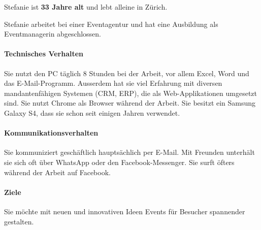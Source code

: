 \begin{minipage}{0.70\textwidth}
Stefanie ist \textbf{33 Jahre alt} und lebt alleine in Zürich.

Stefanie arbeitet bei einer Eventagentur und hat eine Ausbildung als Eventmanagerin abgeschlossen.

\paragraph{Technisches Verhalten}
Sie nutzt den PC täglich 8 Stunden bei der Arbeit, vor allem Excel, Word und das E-Mail-Programm. Ausserdem hat sie viel Erfahrung mit diversen mandantenfähigen Systemen (CRM, ERP), die als Web-Applikationen umgesetzt sind. Sie nutzt Chrome als Browser während der Arbeit. Sie besitzt ein Samsung Galaxy S4, dass sie schon seit einigen Jahren verwendet.
\paragraph{Kommunikationsverhalten}
Sie kommuniziert geschäftlich hauptsächlich per E-Mail. Mit Freunden unterhält sie sich oft über WhatsApp oder den Facebook-Messenger. Sie surft öfters während der Arbeit auf Facebook.
\paragraph{Ziele}
Sie möchte mit neuen und innovativen Ideen Events für Besucher spannender gestalten.
\end{minipage}

